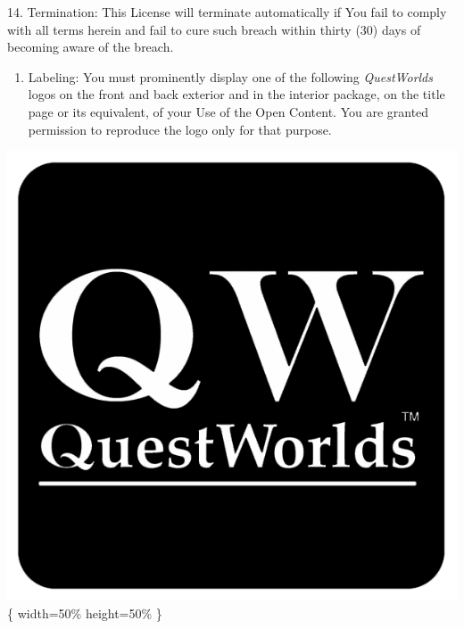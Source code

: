\documentclass[
]{article}
\providecommand{\tightlist}{%
  \setlength{\itemsep}{0pt}\setlength{\parskip}{0pt}}
\begin{document}
14. Termination: This License will terminate automatically if You fail
to comply with all terms herein and fail to cure such breach within
thirty (30) days of becoming aware of the breach.

\begin{enumerate}
\def\labelenumi{\arabic{enumi}.}
\setcounter{enumi}{14}
\tightlist
\item
  Labeling: You must prominently display one of the following
  \emph{QuestWorlds} logos on the front and back exterior and in the
  interior package, on the title page or its equivalent, of your Use of
  the Open Content. You are granted permission to reproduce the logo
  only for that purpose.
\end{enumerate}

\includegraphics{Logos/QuestWorlds-Logo-TM-black.png} \{ width=50\%
height=50\% \}
\end{document}
